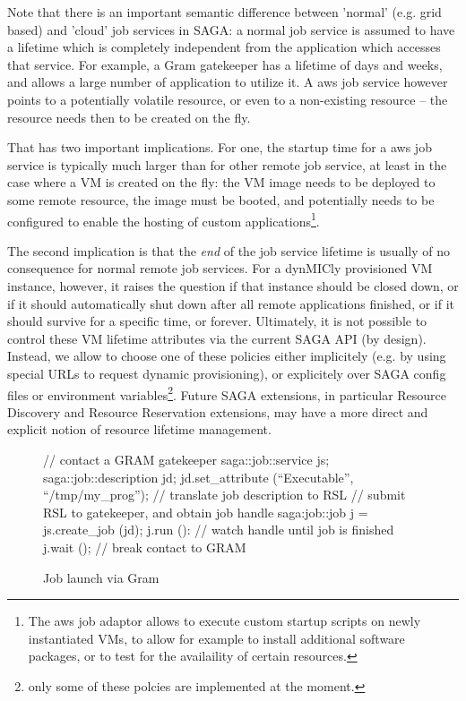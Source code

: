 \documentclass[conference,final]{IEEEtran}
\newcommand{\upp}{\vspace*{-0.5em}}
\newcommand{\I}[1]{\textit{#1}}
\begin{document}
  Note that there is an important semantic difference between 'normal'
  (e.g. grid based) and 'cloud' job services in SAGA: a normal job
  service is assumed to have a lifetime which is completely
  independent from the application which accesses that service.  For
  example, a Gram gatekeeper has a lifetime of days and weeks, and
  allows a large number of application to utilize it.  A aws job
  service however points to a potentially  volatile resource, or even
  to a non-existing resource -- the resource needs then to be created
  on the fly.

  That has two important implications.  For one, the startup time for
  a aws job service is typically much larger than for other remote job
  service, at least in the case where a VM is created on the fly: the
  VM image needs to be deployed to some remote resource, the image
  must be booted, and potentially needs to be configured to enable the
  hosting of custom applications\footnote{The aws job adaptor allows
  to execute custom startup scripts on newly instantiated VMs, to
  allow for example to install additional software packages, or to
  test for the availaility of certain resources.}.

  The second implication is that the \I{end} of the job service
  lifetime is usually of no consequence for normal remote job
  services.  For a dynMICly provisioned VM instance, however, it
  raises the question if that instance should be closed down, or if it
  should automatically shut down after all remote applications
  finished, or if it should  survive for a specific time, or forever.
  Ultimately, it is not possible to control these VM lifetime
  attributes via the current SAGA API (by design).  Instead, we
  allow to choose one of these policies either implicitely (e.g. by
  using special URLs to request dynamic provisioning), or explicitely
  over SAGA config files or environment variables\footnote{only some
  of these polcies are implemented at the moment.}.  Future SAGA
  extensions, in particular Resource Discovery and Resource
  Reservation extensions, may have a more direct and explicit notion
  of resource lifetime management.


\begin{figure}[!ht]
\upp 
 \begin{center}
  \begin{mycode}[label=SAGA Job Launch via GRAM gatekeeper]
  { // contact a GRAM gatekeeper
    saga::job::service     js;
    saga::job::description jd;
    jd.set_attribute (``Executable'', ``/tmp/my_prog'');
    // translate job description to RSL
    // submit RSL to gatekeeper, and obtain job handle
    saga:job::job j = js.create_job (jd);
    j.run ():
    // watch handle until job is finished
    j.wait ();
   } // break contact to GRAM
  \end{mycode}
  \caption{\label{gramjob}Job launch via Gram }
 \end{center}
\upp
\end{figure}
\end{document}
